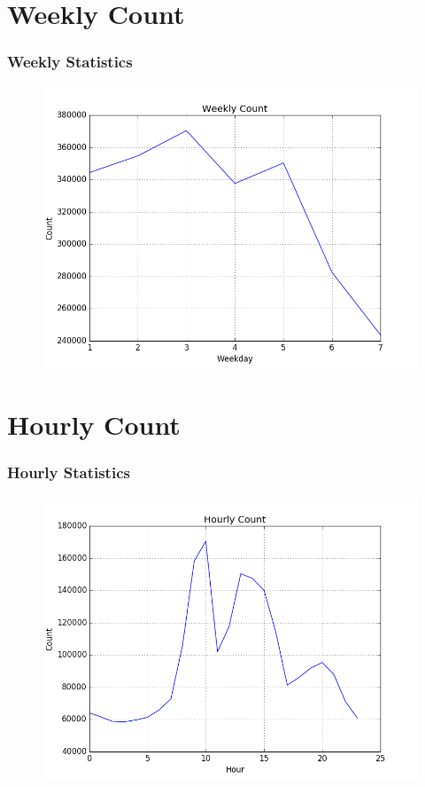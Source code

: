 \section{Weekly Count}
\begin{frame}
\frametitle{Weekly Statistics}
\begin{figure}
\includegraphics[width=\textwidth]{img/Week.png}
\end{figure}
\end{frame}

\section{Hourly Count}
\begin{frame}
\frametitle{Hourly Statistics}
\begin{figure}
\includegraphics[width=\textwidth]{img/Hour.png}
\end{figure}
\end{frame}


